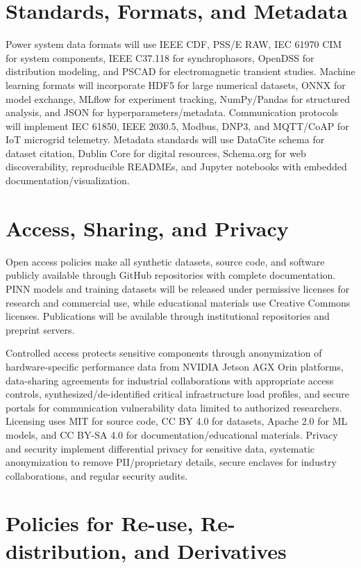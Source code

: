 \documentclass[12pt]{article}
\begin{document}
\section{Standards, Formats, and Metadata}

Power system data formats will use IEEE CDF, PSS/E RAW, IEC 61970 CIM for system components, IEEE C37.118 for synchrophasors, OpenDSS for distribution modeling, and PSCAD for electromagnetic transient studies. Machine learning formats will incorporate HDF5 for large numerical datasets, ONNX for model exchange, MLflow for experiment tracking, NumPy/Pandas for structured analysis, and JSON for hyperparameters/metadata. Communication protocols will implement IEC 61850, IEEE 2030.5, Modbus, DNP3, and MQTT/CoAP for IoT microgrid telemetry. Metadata standards will use DataCite schema for dataset citation, Dublin Core for digital resources, Schema.org for web discoverability, reproducible READMEs, and Jupyter notebooks with embedded documentation/visualization.

\section{Access, Sharing, and Privacy}

Open access policies make all synthetic datasets, source code, and software publicly available through GitHub repositories with complete documentation. PINN models and training datasets will be released under permissive licenses for research and commercial use, while educational materials use Creative Commons licenses. Publications will be available through institutional repositories and preprint servers.

Controlled access protects sensitive components through anonymization of hardware-specific performance data from NVIDIA Jetson AGX Orin platforms, data-sharing agreements for industrial collaborations with appropriate access controls, synthesized/de-identified critical infrastructure load profiles, and secure portals for communication vulnerability data limited to authorized researchers. Licensing uses MIT for source code, CC BY 4.0 for datasets, Apache 2.0 for ML models, and CC BY-SA 4.0 for documentation/educational materials. Privacy and security implement differential privacy for sensitive data, systematic anonymization to remove PII/proprietary details, secure enclaves for industry collaborations, and regular security audits.

\section{Policies for Re-use, Re-distribution, and Derivatives}
\end{document}
